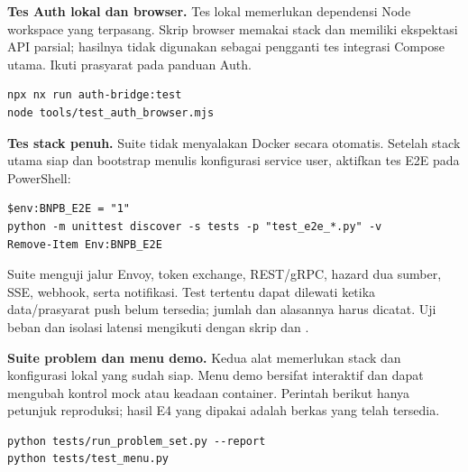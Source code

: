 \textbf{Tes Auth lokal dan browser.} Tes lokal memerlukan dependensi Node workspace yang terpasang. Skrip browser memakai stack  dan memiliki ekspektasi API parsial; hasilnya tidak digunakan sebagai pengganti tes integrasi Compose utama. Ikuti prasyarat pada panduan Auth.
\begin{lstlisting}
npx nx run auth-bridge:test
node tools/test_auth_browser.mjs
\end{lstlisting}

\textbf{Tes stack penuh.} Suite tidak menyalakan Docker secara otomatis. Setelah stack utama siap dan bootstrap menulis konfigurasi service user, aktifkan tes E2E pada PowerShell:
\begin{lstlisting}
$env:BNPB_E2E = "1"
python -m unittest discover -s tests -p "test_e2e_*.py" -v
Remove-Item Env:BNPB_E2E
\end{lstlisting}

Suite menguji jalur Envoy, token exchange, REST/gRPC, hazard dua sumber, SSE, webhook, serta notifikasi. Test tertentu dapat dilewati ketika data/prasyarat push belum tersedia; jumlah dan alasannya harus dicatat. Uji beban dan isolasi latensi mengikuti  dengan skrip  dan .

\textbf{Suite problem dan menu demo.} Kedua alat memerlukan stack dan konfigurasi lokal yang sudah siap. Menu demo bersifat interaktif dan dapat mengubah kontrol mock atau keadaan container. Perintah berikut hanya petunjuk reproduksi; hasil E4 yang dipakai adalah berkas yang telah tersedia.
\begin{lstlisting}
python tests/run_problem_set.py --report
python tests/test_menu.py
\end{lstlisting}

